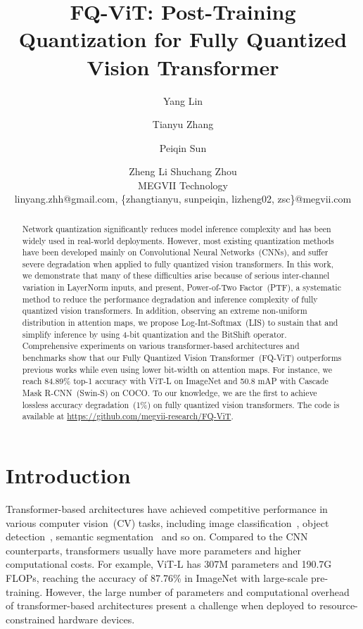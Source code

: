 \documentclass{article}
\title{FQ-ViT: Post-Training Quantization for Fully Quantized Vision Transformer}
\author{
Yang Lin\footnotemark[1]\footnotemark[2]\and
Tianyu Zhang\footnotemark[1] \and
Peiqin Sun\footnotemark[3]\and
Zheng Li \And
Shuchang Zhou\\
\affiliations
MEGVII Technology\\
\emails
linyang.zhh@gmail.com, \{zhangtianyu, sunpeiqin, lizheng02, zsc\}@megvii.com
}
\begin{document}
\maketitle

\renewcommand{\thefootnote}{\fnsymbol{footnote}}


\begin{abstract}
Network quantization significantly reduces model inference complexity and has been widely used in real-world deployments. However, most existing quantization methods have been developed mainly on Convolutional Neural Networks~(CNNs), and suffer severe degradation when applied to fully quantized vision transformers. In this work, we demonstrate that many of these difficulties arise because of serious inter-channel variation in LayerNorm inputs, and present, Power-of-Two Factor~(PTF), a systematic method to reduce the performance degradation and inference complexity of fully quantized vision transformers. In addition, observing an extreme non-uniform distribution in attention maps, we propose Log-Int-Softmax~(LIS) to sustain that and simplify inference by using 4-bit quantization and the BitShift operator. Comprehensive experiments on various transformer-based architectures and benchmarks show that our Fully Quantized Vision Transformer~(FQ-ViT) outperforms previous works while even using lower bit-width on attention maps. For instance, we reach 84.89\% top-1 accuracy with ViT-L on ImageNet and 50.8 mAP with Cascade Mask R-CNN~(Swin-S) on COCO. To our knowledge, we are the first to achieve lossless accuracy degradation~(1\%) on fully quantized vision transformers. The code is available at \url{https://github.com/megvii-research/FQ-ViT}.
\end{abstract}


\section{Introduction}

Transformer-based architectures have achieved competitive performance in various computer vision~(CV) tasks, including image classification~\cite{dosovitskiy2021an,touvron2021training}, object detection~\cite{carion2020end,liu2021swin}, semantic segmentation~\cite{zheng2021rethinking} and so on. Compared to the CNN counterparts, transformers usually have more parameters and higher computational costs. For example, ViT-L has 307M parameters and 190.7G FLOPs, reaching the accuracy of 87.76\% in ImageNet with large-scale pre-training. However, the large number of parameters and computational overhead of transformer-based architectures present a challenge when deployed to resource-constrained hardware devices.
\end{document}
